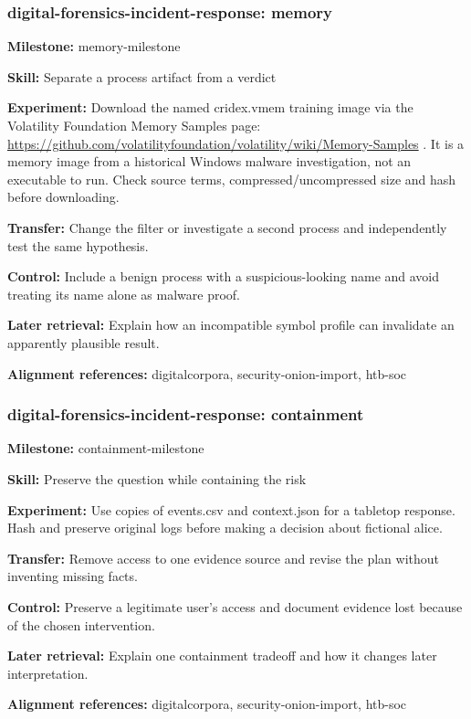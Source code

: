 \subsubsection{digital-forensics-incident-response: memory}
\noindent\textbf{Milestone:} memory-milestone\par
\noindent\textbf{Skill:} Separate a process artifact from a verdict\par
\noindent\textbf{Experiment:} Download the named cridex.vmem training image via the Volatility Foundation Memory Samples page: \url{https://github.com/volatilityfoundation/volatility/wiki/Memory-Samples} . It is a memory image from a historical Windows malware investigation, not an executable to run. Check source terms, compressed/uncompressed size and hash before downloading.\par
\noindent\textbf{Transfer:} Change the filter or investigate a second process and independently test the same hypothesis.\par
\noindent\textbf{Control:} Include a benign process with a suspicious-looking name and avoid treating its name alone as malware proof.\par
\noindent\textbf{Later retrieval:} Explain how an incompatible symbol profile can invalidate an apparently plausible result.\par
\noindent\textbf{Alignment references:} digitalcorpora, security-onion-import, htb-soc\par
\subsubsection{digital-forensics-incident-response: containment}
\noindent\textbf{Milestone:} containment-milestone\par
\noindent\textbf{Skill:} Preserve the question while containing the risk\par
\noindent\textbf{Experiment:} Use copies of events.csv and context.json for a tabletop response. Hash and preserve original logs before making a decision about fictional alice.\par
\noindent\textbf{Transfer:} Remove access to one evidence source and revise the plan without inventing missing facts.\par
\noindent\textbf{Control:} Preserve a legitimate user's access and document evidence lost because of the chosen intervention.\par
\noindent\textbf{Later retrieval:} Explain one containment tradeoff and how it changes later interpretation.\par
\noindent\textbf{Alignment references:} digitalcorpora, security-onion-import, htb-soc\par
